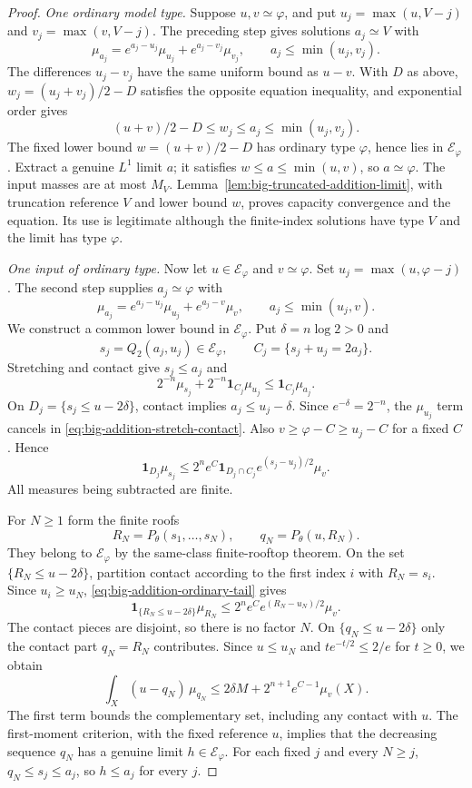 \begin{proof}
\emph{One ordinary model type.}
Suppose $u,v\simeq\varphi$, and put $u_j=\max(u,V-j)$ and $v_j=\max(v,V-j)$. The preceding step gives solutions $a_j\simeq V$ with
\[
 \mu_{a_j}=e^{a_j-u_j}\mu_{u_j}+e^{a_j-v_j}\mu_{v_j},
 \qquad a_j\leq\min(u_j,v_j).
\]
The differences $u_j-v_j$ have the same uniform bound as $u-v$. With $D$ as above, $w_j=(u_j+v_j)/2-D$ satisfies the opposite equation inequality, and exponential order gives
\[
 (u+v)/2-D\leq w_j\leq a_j\leq\min(u_j,v_j).
\]
The fixed lower bound $w=(u+v)/2-D$ has ordinary type $\varphi$, hence lies in $\mathcal E_\varphi$. Extract a genuine $L^1$ limit $a$; it satisfies $w\leq a\leq\min(u,v)$, so $a\simeq\varphi$. The input masses are at most $M_V$. Lemma~\ref{lem:big-truncated-addition-limit}, with truncation reference $V$ and lower bound $w$, proves capacity convergence and the equation. Its use is legitimate although the finite-index solutions have type $V$ and the limit has type $\varphi$.

\emph{One input of ordinary type.}
Now let $u\in\mathcal E_\varphi$ and $v\simeq\varphi$. Set $u_j=\max(u,\varphi-j)$. The second step supplies $a_j\simeq\varphi$ with
\[
 \mu_{a_j}=e^{a_j-u_j}\mu_{u_j}+e^{a_j-v}\mu_v,
 \qquad a_j\leq\min(u_j,v).
\]
We construct a common lower bound in $\mathcal E_\varphi$. Put $\delta=n\log2>0$ and
\[
 s_j=Q_2(a_j,u_j)\in\mathcal E_\varphi,
 \qquad C_j=\{s_j+u_j=2a_j\}.
\]
Stretching and contact give $s_j\leq a_j$ and
\begin{equation}\label{eq:big-addition-stretch-contact}
 2^{-n}\mu_{s_j}+2^{-n}\mathbf1_{C_j}\mu_{u_j}
 \leq\mathbf1_{C_j}\mu_{a_j}.
\end{equation}
On $D_j=\{s_j\leq u-2\delta\}$, contact implies $a_j\leq u_j-\delta$. Since $e^{-\delta}=2^{-n}$, the $\mu_{u_j}$ term cancels in \eqref{eq:big-addition-stretch-contact}. Also $v\geq\varphi-C\geq u_j-C$ for a fixed $C$. Hence
\begin{equation}\label{eq:big-addition-ordinary-tail}
 \mathbf1_{D_j}\mu_{s_j}
 \leq2^n e^C\mathbf1_{D_j\cap C_j}
                e^{(s_j-u_j)/2}\mu_v.
\end{equation}
All measures being subtracted are finite.

For $N\geq1$ form the finite roofs
\[
 R_N=P_\theta(s_1,\ldots,s_N),\qquad q_N=P_\theta(u,R_N).
\]
They belong to $\mathcal E_\varphi$ by the same-class finite-rooftop theorem. On the set $\{R_N\leq u-2\delta\}$, partition contact according to the first index $i$ with $R_N=s_i$. Since $u_i\geq u_N$, \eqref{eq:big-addition-ordinary-tail} gives
\[
 \mathbf1_{\{R_N\leq u-2\delta\}}\mu_{R_N}
 \leq2^n e^C e^{(R_N-u_N)/2}\mu_v.
\]
The contact pieces are disjoint, so there is no factor $N$. On $\{q_N\leq u-2\delta\}$ only the contact part $q_N=R_N$ contributes. Since $u\leq u_N$ and $t e^{-t/2}\leq2/e$ for $t\geq0$, we obtain
\[
 \int_X(u-q_N)\,\mu_{q_N}
 \leq 2\delta M+2^{n+1}e^{C-1}\mu_v(X).
\]
The first term bounds the complementary set, including any contact with $u$. The first-moment criterion, with the fixed reference $u$, implies that the decreasing sequence $q_N$ has a genuine limit $h\in\mathcal E_\varphi$. For each fixed $j$ and every $N\geq j$, $q_N\leq s_j\leq a_j$, so $h\leq a_j$ for every $j$.


\end{proof}
